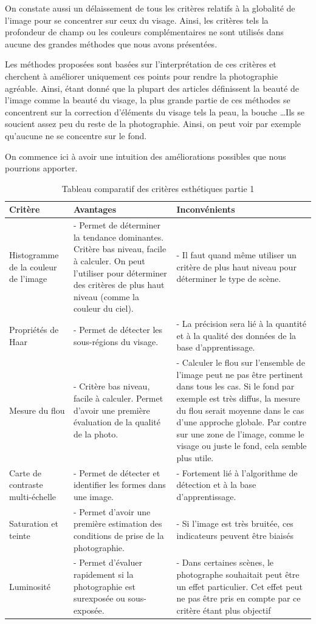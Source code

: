 \documentclass[11pt, french,screen]{report-rd-info}
\begin{document}
On constate aussi un délaissement de tous les critères relatifs à la globalité de l’image pour se concentrer sur ceux du visage. Ainsi, les critères tels la profondeur de champ ou les couleurs complémentaires ne sont utilisés dans aucune des grandes méthodes que nous avons présentées.

Les méthodes proposées sont basées sur l’interprétation de ces critères et cherchent à améliorer uniquement ces points pour rendre la photographie agréable. Ainsi, étant donné que la plupart des articles définissent la beauté de l’image comme la beauté du visage, la plus grande partie de ces méthodes se concentrent sur la correction d’éléments du visage tels la peau, la bouche \ldots Ils se soucient assez peu du reste de la photographie. Ainsi, on peut voir par exemple qu’aucune ne se concentre sur le fond.

On commence ici à avoir une intuition des améliorations possibles que nous pourrions apporter.
\begin{table}
\begin{center}
\begin{tabular}{|p{3cm}|p{6cm}|p{7cm}|}
\hline
\textbf{Critère} & \textbf{Avantages} & \textbf{Inconvénients} \\ \hline
Histogramme de la couleur de l'image & - Permet de déterminer la tendance dominantes. Critère bas niveau, facile à calculer. On peut l'utiliser pour déterminer des critères de plus haut niveau (comme la couleur du ciel). & - Il faut quand même utiliser un critère de plus haut niveau pour déterminer le type de scène. \\ \hline
Propriétés de Haar & - Permet de détecter les sous-régions du visage. & - La précision sera lié à la quantité et à la qualité des données de la base d'apprentissage. \\ \hline
Mesure du flou & - Critère bas niveau, facile à calculer. Permet d'avoir une première évaluation de la qualité de la photo. & - Calculer le flou sur l'ensemble de l'image peut ne pas être pertinent dans tous les cas. Si le fond par exemple est très diffus, la mesure du flou serait moyenne dans le cas d'une approche globale. Par contre sur une zone de l'image, comme le visage ou juste le fond, cela semble plus utile. \\ \hline
Carte de contraste multi-échelle & - Permet de détecter et identifier les formes dans une image. & - Fortement lié à l’algorithme de détection et à la base d'apprentissage. \\ \hline
Saturation et teinte & - Permet d'avoir une première estimation des conditions de prise de la photographie. & - Si l'image est très bruitée, ces indicateurs peuvent être biaisés \\ \hline
Luminosité & - Permet d'évaluer rapidement si la photographie est surexposée ou sous-exposée. & - Dans certaines scènes, le photographe souhaitait peut être un effet particulier. Cet effet peut ne pas être pris en compte par ce critère étant plus objectif\\ \hline
\end{tabular}
\end{center}
\caption{Tableau comparatif des critères esthétiques partie 1}
\label{tab:ComparaisonCriteres1}
\end{table}
\end{document}
